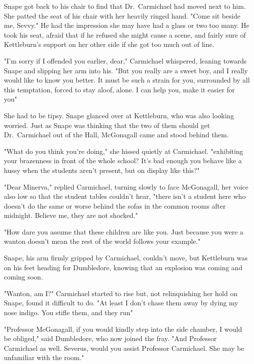 Snape got back to his chair to find that Dr.~Carmichael had moved next to him. She patted the seat of his chair with her heavily ringed hand. "Come sit beside me, Sevvy." He had the impression she may have had a glass or two too many. He took his seat, afraid that if he refused she might cause a scene, and fairly sure of Kettleburn's support on her other side if she got too much out of line.

"I'm sorry if I offended you earlier, dear," Carmichael whispered, leaning towards Snape and slipping her arm into his. "But you really are a sweet boy, and I really would like to know you better. It must be such a strain for you, surrounded by all this temptation, forced to stay aloof, alone. I can help you, make it easier for you{\el}"

She had to be tipsy. Snape glanced over at Kettleburn, who was also looking worried. Just as Snape was thinking that the two of them should get Dr.~Carmichael out of the Hall, McGonagall came and stood behind them.

"What do you think you're doing," she hissed quietly at Carmichael. "exhibiting your brazenness in front of the whole school? It's bad enough you behave like a hussy when the students aren't present, but on display like this?"

"Dear Minerva," replied Carmichael, turning slowly to face McGonagall, her voice also low so that the student tables couldn't hear, "there isn't a student here who doesn't do the same or worse behind the sofas in the common rooms after midnight. Believe me, they are not shocked."

"How dare you assume that these children are like you. Just because you were a wanton doesn't mean the rest of the world follows your example."

Snape, his arm firmly gripped by Carmichael, couldn't move, but Kettleburn was on his feet heading for Dumbledore, knowing that an explosion was coming and coming soon.

"Wanton, am I?" Carmichael started to rise but, not relinquishing her hold on Snape, found it difficult to do. "At least I don't chase them away by dying my nose indigo. You stifle them, and they run{\el}"

"Professor McGonagall, if you would kindly step into the side chamber, I would be obliged," said Dumbledore, who now joined the fray. "And Professor Carmichael as well. Severus, would you assist Professor Carmichael. She may be unfamiliar with the room."

